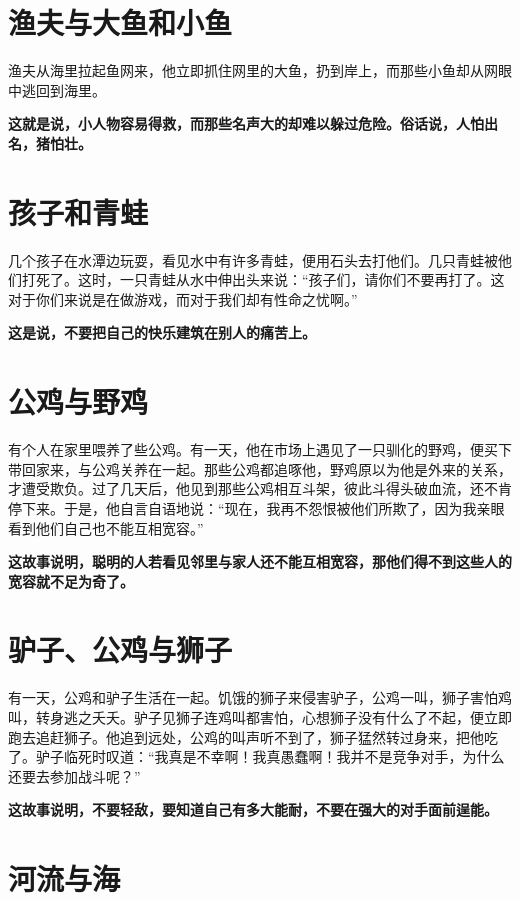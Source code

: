 \section{渔夫与大鱼和小鱼}

渔夫从海里拉起鱼网来，他立即抓住网里的大鱼，扔到岸上，而那些小鱼却从网眼中逃回到海里。

{\bfseries \color{red}这就是说，小人物容易得救，而那些名声大的却难以躲过危险。俗话说，人怕出名，猪怕壮。}

\section{孩子和青蛙}

几个孩子在水潭边玩耍，看见水中有许多青蛙，便用石头去打他们。几只青蛙被他们打死了。这时，一只青蛙从水中伸出头来说：“孩子们，请你们不要再打了。这对于你们来说是在做游戏，而对于我们却有性命之忧啊。”

{\bfseries \color{red}这是说，不要把自己的快乐建筑在别人的痛苦上。}

\section{公鸡与野鸡}

有个人在家里喂养了些公鸡。有一天，他在市场上遇见了一只驯化的野鸡，便买下带回家来，与公鸡关养在一起。那些公鸡都追啄他，野鸡原以为他是外来的关系，才遭受欺负。过了几天后，他见到那些公鸡相互斗架，彼此斗得头破血流，还不肯停下来。于是，他自言自语地说：“现在，我再不怨恨被他们所欺了，因为我亲眼看到他们自己也不能互相宽容。”

{\bfseries \color{red}这故事说明，聪明的人若看见邻里与家人还不能互相宽容，那他们得不到这些人的宽容就不足为奇了。}

\section{驴子、公鸡与狮子}

有一天，公鸡和驴子生活在一起。饥饿的狮子来侵害驴子，公鸡一叫，狮子害怕鸡叫，转身逃之夭夭。驴子见狮子连鸡叫都害怕，心想狮子没有什么了不起，便立即跑去追赶狮子。他追到远处，公鸡的叫声听不到了，狮子猛然转过身来，把他吃了。驴子临死时叹道：“我真是不幸啊！我真愚蠢啊！我并不是竞争对手，为什么还要去参加战斗呢？”

{\bfseries \color{red}这故事说明，不要轻敌，要知道自己有多大能耐，不要在强大的对手面前逞能。}

\section{河流与海}

